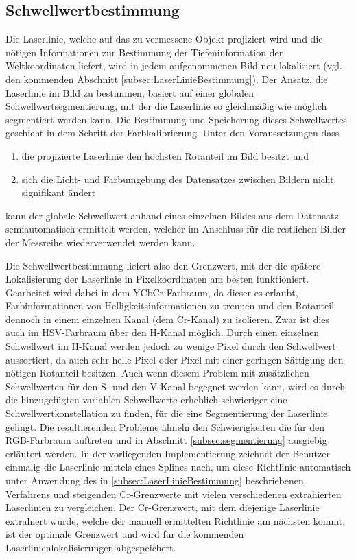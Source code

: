 \subsection{Schwellwertbestimmung}
\label{subsec:Farbkalibrierung}
Die Laserlinie, welche auf das zu vermessene Objekt projiziert wird und die nötigen Informationen zur Bestimmung der Tiefeninformation der Weltkoordinaten liefert, wird in jedem aufgenommenen Bild neu lokalisiert (vgl. den kommenden Abschnitt \ref{subsec:LaserLinieBestimmung}). Der Ansatz, die Laserlinie im Bild zu bestimmen, basiert auf einer globalen Schwellwertsegmentierung, mit der die Laserlinie so gleichmäßig wie möglich segmentiert werden kann. Die Bestimmung und Speicherung dieses Schwellwertes geschieht in dem Schritt der Farbkalibrierung. Unter den Voraussetzungen dass 
\begin{enumerate}
\item die projizierte Laserlinie den höchsten Rotanteil im Bild besitzt und 
\item sich die Licht- und Farbumgebung des Datensatzes zwischen Bildern nicht signifikant ändert
\end{enumerate} 
kann der globale Schwellwert anhand eines einzelnen Bildes aus dem Datensatz semiautomatisch ermittelt werden, welcher im Anschluss für die restlichen Bilder der Messreihe wiederverwendet werden kann. \bigbreak

Die Schwellwertbestimmung liefert also den Grenzwert, mit der die spätere Lokalisierung der Laserlinie in Pixelkoordinaten am besten funktioniert. Gearbeitet wird dabei in dem YCbCr-Farbraum, da dieser es erlaubt, Farbinformationen von Helligkeitsinformationen zu trennen und den Rotanteil dennoch in einem einzelnen Kanal (dem Cr-Kanal) zu isolieren. Zwar ist dies auch im HSV-Farbraum über den H-Kanal möglich. Durch einen einzelnen Schwellwert im H-Kanal werden jedoch zu wenige Pixel durch den Schwellwert aussortiert, da auch sehr helle Pixel oder Pixel mit einer geringen Sättigung den nötigen Rotanteil besitzen. Auch wenn diesem Problem mit zusätzlichen Schwellwerten für den S- und den V-Kanal begegnet werden kann, wird es durch die hinzugefügten variablen Schwellwerte erheblich schwieriger eine Schwellwertkonstellation zu finden, für die eine Segmentierung der Laserlinie gelingt. Die resultierenden Probleme ähneln den Schwierigkeiten die für den RGB-Farbraum auftreten und in Abschnitt \ref{subsec:segmentierung} ausgiebig erläutert werden. In der vorliegenden Implementierung zeichnet der Benutzer einmalig die Laserlinie mittels eines Splines nach, um diese Richtlinie automatisch unter Anwendung des in \ref{subsec:LaserLinieBestimmung} beschriebenen Verfahrens und steigenden Cr-Grenzwerte mit vielen verschiedenen extrahierten Laserlinien zu vergleichen. Der Cr-Grenzwert, mit dem diejenige Laserlinie extrahiert wurde, welche der manuell ermittelten Richtlinie am nächsten kommt, ist der optimale Grenzwert und wird für die kommenden Laserlinienlokalisierungen abgespeichert.
\bigbreak

